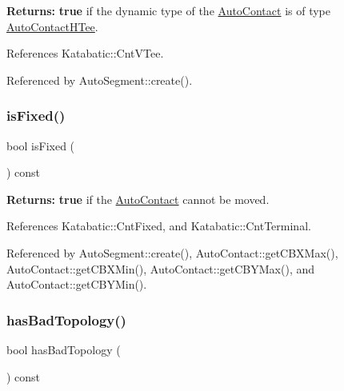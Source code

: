 {\bfseries Returns\+:} {\bfseries true} if the dynamic type of the \hyperlink{classKatabatic_1_1AutoContact}{Auto\+Contact} is of type \hyperlink{classKatabatic_1_1AutoContactHTee}{Auto\+Contact\+H\+Tee}. 

References Katabatic\+::\+Cnt\+V\+Tee.



Referenced by Auto\+Segment\+::create().

\mbox{\label{classKatabatic_1_1AutoContact_afd7362b850709bed8b61c1aa22399f97}} 
\subsubsection{\texorpdfstring{is\+Fixed()}{isFixed()}}
{\footnotesize\ttfamily bool is\+Fixed (\begin{DoxyParamCaption}{ }\end{DoxyParamCaption}) const\hspace{0.3cm}{\ttfamily [inline]}}

{\bfseries Returns\+:} {\bfseries true} if the \hyperlink{classKatabatic_1_1AutoContact}{Auto\+Contact} cannot be moved. 

References Katabatic\+::\+Cnt\+Fixed, and Katabatic\+::\+Cnt\+Terminal.



Referenced by Auto\+Segment\+::create(), Auto\+Contact\+::get\+C\+B\+X\+Max(), Auto\+Contact\+::get\+C\+B\+X\+Min(), Auto\+Contact\+::get\+C\+B\+Y\+Max(), and Auto\+Contact\+::get\+C\+B\+Y\+Min().

\mbox{\label{classKatabatic_1_1AutoContact_acc77b6de9050a86dc41e25888c8f81f6}} 
\subsubsection{\texorpdfstring{has\+Bad\+Topology()}{hasBadTopology()}}
{\footnotesize\ttfamily bool has\+Bad\+Topology (\begin{DoxyParamCaption}{ }\end{DoxyParamCaption}) const\hspace{0.3cm}{\ttfamily [inline]}}

